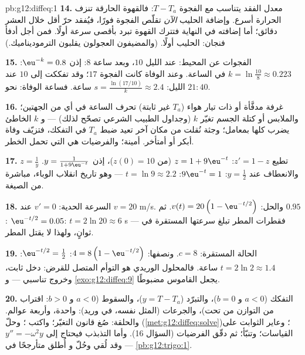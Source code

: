 \begin{solution}{pb:g12:diffeq:1}
\textbf{14.} معدل الفقد يتناسب مع الفجوة
$T - T_a$: فالقهوة الحارقة تنزف الحرارة أسرع. وإضافة
الحليب \emph{الآن} تقلّص الفجوة فورًا، فيُفقد حرّ أقل
خلال العشر دقائق؛ أما إضافته في النهاية فتترك
القهوة تبرد بأقصى سرعة أولًا. فمن أجل أدفأ فنجان: الحليب
أولًا. (والمضيفون العجولون يقلبون الترموديناميك.)

\textbf{15.} الفجوات عن المحيط: عند  الليل $10$، وبعد ساعة
$8$: إذن $\eu^{-k} = 0.8$:
$k = \ln\frac{10}{8} \approx 0.223$ في الساعة. وعند الوفاة كانت الفجوة
$17$؛ وقد تفككت إلى $10$ عند  الليل:
$s = \frac{\ln(17/10)}{k} \approx 2.4$ ساعة. فساعة الوفاة:
نحو $21{:}40$.

\textbf{16.} غرفة مدفَّأة أو ذات تيار هواء ($T_a$ غير ثابتة)
تحرف الساعة في أي من الجهتين؛ والملابس أو كتلة الجسم تغيّر $k$
(وجداول الطبيب الشرعي تصحّح لذلك) --- و $k$ الخاطئ يضرب
 كلها بمعامل؛ وجثة نُقلت من مكان آخر تعيد ضبط
$T_a$ في  التفكك، فتزيّف وفاة أبكر أو أمتأخر. 
أمينة؛ والفرضيات هي التي تحمل الخطر.

\textbf{17.} $z = \frac1y$ تطيع $z' = 1 - z$:
$z = 1 + 9\eu^{-t}$ (من $z(0) = 10$)، إذن
$y = \frac{1}{1 + 9\eu^{-t}}$. والانعطاف عند $y = \frac12$:
$9\eu^{-t} = 1$: $t = \ln 9 \approx 2.2$ --- وهو تاريخ انقلاب
الوباء، مباشرة من الصيغة.

\textbf{18.} السرعة الحدية: $v' = 0$ عند $v = 20$ m/s.
والحل: $v(t) = 20\left(1 - \eu^{-t/2}\right)$. ثم
$0.95$: $\eu^{-t/2} = 0.05$: $t = 2\ln 20 \approx 6$ s ---
فقطرات المطر تبلغ سرعتها المستقرة في ثوانٍ، ولهذا
لا يقتل المطر.

\textbf{19.} الحالة المستقرة: $c = 8$. ونصفها:
$4 = 8\left(1 - \eu^{-t/2}\right)$: $\eu^{-t/2} = \frac12$:
$t = 2\ln 2 \approx 1.4$ ساعة. فالمحلول الوريدي هو التوأم المتصل
للقرض: دخل ثابت، وخروج تناسبي ---
و \cref{exo:g12:diffeq:9} يجعل القاموس مضبوطًا.

\textbf{20.} التفكك ($a < 0$ و $b = 0$)، والتبرّد ($y = T - T_a$)،
والسقوط ($a < 0$ و $b > 0$: اقتراب من التوازن من
تحت)، والجرعات (المثل نفسه، في وريد):  واحدة، وأربعة عوالم.
والحلقة: صُغ قانون التغيّر؛ واكتب ؛ وحلّ
(\cref{met:g12:diffeq:solve})؛ وعاير الثوابت على
القياسات؛ وتنبّأ؛ ثم دقّق الفرضيات (السؤال
16). وأما التذبذب فيحتاج إلى $y'' = -\omega^2 y$ --- وقد لُقي وحُلّ و
أُطلق متأرجحًا في \cref{pb:g12:trigo:1}.
\end{solution}
